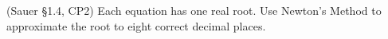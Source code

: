 \documentclass[12pt,fleqn]{exam}
\begin{document}
\begin{questions}
\question (Sauer \S1.4, CP2) Each equation has one real root. Use Newton's Method to approximate the root to eight correct decimal places.


\end{questions}
\end{document}
